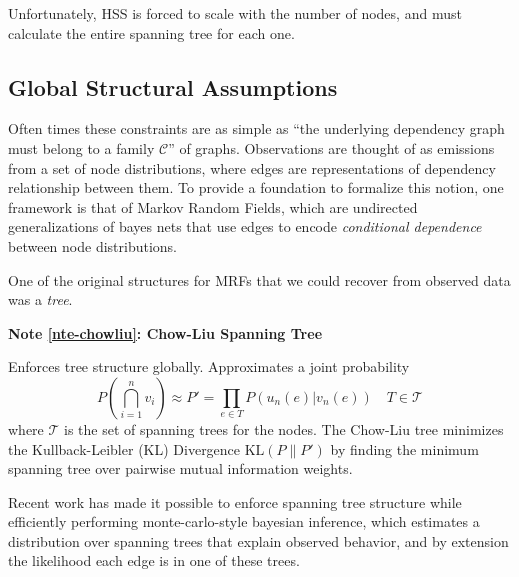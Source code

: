 \documentclass[%
	12pt,
		oneside,
		letterpaper
]{book}
\newcounter{quartocalloutnteno}
\newcommand{\quartocalloutnte}[1]{\refstepcounter{quartocalloutnteno}\label{#1}}
\begin{document}
Unfortunately, HSS is forced to scale with the number of nodes, and must calculate the entire spanning tree for each one.

\subsection{Global Structural Assumptions}\label{global-structural-assumptions}

Often times these constraints are as simple as ``the underlying dependency graph must belong to a family \(\mathcal{C}\)'' of graphs.
Observations are thought of as emissions from a set of node distributions, where edges are representations of dependency relationship between them.
To provide a foundation to formalize this notion, one framework is that of Markov Random Fields, which are undirected generalizations of bayes nets \autocite{Markovrandomfields_Kindermann1980} that use edges to encode \emph{conditional dependence} between node distributions.

One of the original structures for MRFs that we could recover from observed data was a \emph{tree}.

\begin{tcolorbox}[enhanced jigsaw, bottomrule=.15mm, colback=white, breakable, toprule=.15mm, colframe=quarto-callout-note-color-frame, leftrule=.75mm, arc=.35mm, opacityback=0, rightrule=.15mm, left=2mm]

\quartocalloutnte{nte-chowliu} 

\vspace{-3mm}\textbf{Note \ref*{nte-chowliu}: Chow-Liu Spanning Tree}\vspace{3mm}

Enforces tree structure globally.
Approximates a joint probability
\[
P\left(\bigcap_{i=1}^n v_i\right) \approx P' = \prod_{e\in T} P(u_n(e)|v_n(e)) \quad T\in \mathcal{T}
\]
where \(\mathcal{T}\) is the set of spanning trees for the nodes.
The Chow-Liu tree minimizes the Kullback-Leibler (KL) Divergence \(\text{KL}(P \| P')\) by finding the minimum spanning tree over pairwise mutual information weights.\autocite{Approximatingdiscreteprobability_Chow1968}

\end{tcolorbox}

Recent work has made it possible to enforce spanning tree structure while efficiently performing monte-carlo-style bayesian inference, which estimates a distribution over spanning trees that explain observed behavior, and by extension the likelihood each edge is in one of these trees. \autocite{BayesianSpanningTree_Duan2021}
\end{document}
